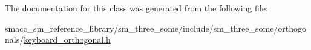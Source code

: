The documentation for this class was generated from the following file\+:\begin{DoxyCompactItemize}
\item 
smacc\+\_\+sm\+\_\+reference\+\_\+library/sm\+\_\+three\+\_\+some/include/sm\+\_\+three\+\_\+some/orthogonals/\hyperlink{keyboard__orthogonal_8h}{keyboard\+\_\+orthogonal.\+h}\end{DoxyCompactItemize}
